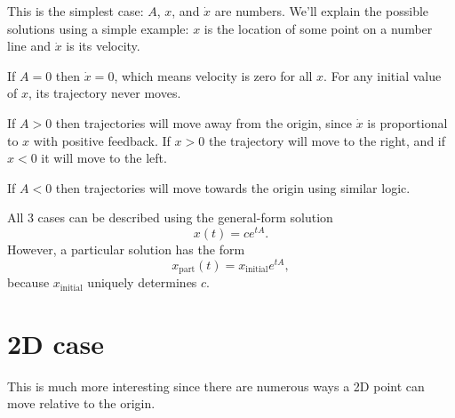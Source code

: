 \documentclass[11pt, oneside]{article}   	%
\begin{document}
This is the simplest case: $A$, $x$, and $\dot{x}$ are numbers.
We'll explain the possible solutions using a simple example: $x$ is the location of some point on a number line and $\dot{x}$ is its velocity.

If $A = 0$ then $\dot{x} = 0$, which means velocity is zero for all $x$.
For any initial value of $x$, its trajectory never moves.

If $A > 0$ then trajectories will move away from the origin, since $\dot{x}$ is proportional to $x$ with positive feedback.
If $x > 0$ the trajectory will move to the right, and if $x < 0$ it will move to the left.

If $A < 0$ then trajectories will move towards the origin using similar logic.

All 3 cases can be described using the general-form solution
$$ x(t) = ce^{tA} . $$
However, a particular solution has the form
$$ x_\mathrm{part}(t) = x_\mathrm{initial} e^{tA} , $$
because $x_\mathrm{initial}$ uniquely determines $c$.


\section{2D case}

This is much more interesting since there are numerous ways a 2D point can move relative to the origin.
\end{document}
